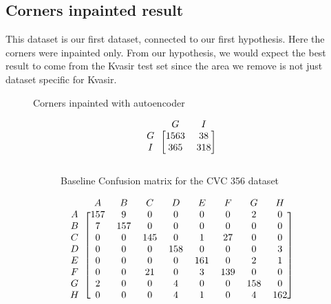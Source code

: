\subsection{Corners inpainted result}
This dataset is our first dataset, connected to our first hypothesis. Here the corners were inpainted only.  
From our hypothesis, we would expect the best result to come from the Kvasir test set since the area we remove is not just dataset specific for Kvasir.



\begin{figure}[h]
\caption{Corners inpainted with autoencoder}
\myfontsize
\caption*{\footnotesize \textmd{ \textbf{A}:{dyed-lifted-polyps} , \textbf{B}:{dyed-resection-margins} , \textbf{C}:{esophagitis} , \textbf{D}:{normal-cecum} , \textbf{E}:{normal-pylorus} , \textbf{F}:{normal-z-line} , \textbf{G}:{polyps} , \textbf{H}:{ulcerative-colitis} , \textbf{I}:{non-polyp}}}

\begin{subfigure}[b]{0.25\textwidth}
     
\[
\begin{blockarray}{ccc}
& G & I  \\
\begin{block}{c[cc]}
        G&1563 &  38\\
        I& 365 &  318\\
\end{block}
\end{blockarray}
 \]         

\caption{Baseline Confusion matrix for the CVC 356 dataset}
\label{mat:cvc356_CM_base}
\end{subfigure}
\begin{subfigure}[b]{0.49\textwidth}  
\scriptsize     
\[
\begin{blockarray}{ccccccccc}
& A & B & C & D & E & F & G & H \\
\begin{block}{c[cccccccc]}
		A& 157&   9 &  0 &  0 &  0 &  0 &  2 &  0\\
        B&  7  &157  & 0  & 0  & 0  & 0  & 0  & 0\\
        C&  0  & 0 &145  & 0  & 1 & 27 &  0  & 0\\
        D&  0  & 0 &  0 & 158 &  0 &  0 &  0  &  3\\
        E&  0  & 0  & 0 &  0 & 161 &  0 &  2  &  1\\
        F&  0  & 0 & 21 &  0 &  3& 139 &  0 &  0\\
        G&  2  & 0 &  0 &  4 &  0 &  0 & 158 &  0\\
        H&  0  & 0  & 0 &  4 &  1 &  0 &  4 & 162\\
\end{block}
\end{blockarray}
 \]        
        

\end{subfigure}
\end{figure}
